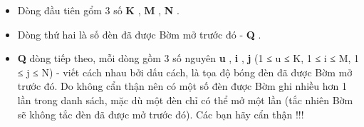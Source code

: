 \begin{itemize}
	\item Dòng đầu tiên gổm 3 số \textbf{ K } , \textbf{ M } , \textbf{ N } .
	\item Dòng thứ hai là số đèn đã được Bờm mở trước đó - \textbf{ Q } .
	\item \textbf{Q } dòng tiếp theo, mỗi dòng gồm 3 số nguyên \textbf{ u } , \textbf{ i } , \textbf{ j }(1 ≤ u ≤ K, 1 ≤ i ≤ M, 1 ≤ j ≤ N) - viết cách nhau bởi dấu cách, là tọa độ bóng đèn đã được Bờm mở trước đó. Do không cẩn thận nên có một số đèn được Bờm ghi nhiều hơn 1 lần trong danh sách, mặc dù một đèn chỉ có thể mở một lần (tắc nhiên Bờm sẽ không tắc đèn đã được mở trước đó). Các bạn hãy cẩn thận !!!
\end{itemize}